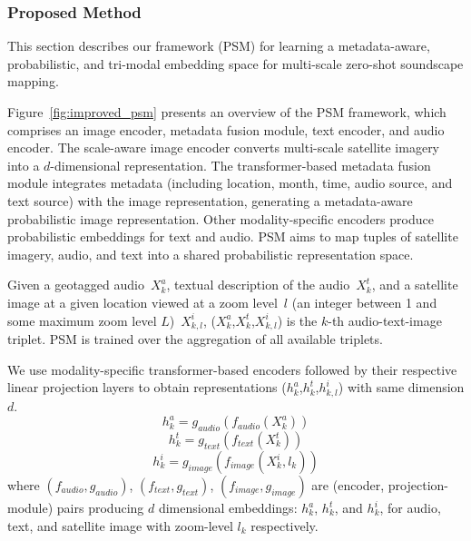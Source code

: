 \subsubsection{Proposed Method}
This section describes our framework (PSM) for learning a metadata-aware, probabilistic, and tri-modal embedding space for multi-scale zero-shot soundscape mapping.

Figure~\ref{fig:improved_psm} presents an overview of the PSM framework, which comprises an image encoder, metadata fusion module, text encoder, and audio encoder. The scale-aware image encoder converts multi-scale satellite imagery into a $d$-dimensional representation. The transformer-based metadata fusion module integrates metadata (including location, month, time, audio source, and text source) with the image representation, generating a metadata-aware probabilistic image representation. Other modality-specific encoders produce probabilistic embeddings for text and audio. PSM aims to map tuples of satellite imagery, audio, and text into a shared probabilistic representation space.

Given a geotagged audio~$X_{k}^{a}$, textual description of the audio~$X_{k}^{t}$, and a satellite image at a given location viewed at a zoom level~$l$ (an integer between 1 and some maximum zoom level $L$)~$X_{k,l}^{i}$,  ($X_{k}^{a}$,$X_{k}^{t}$,$X_{k,l}^{i}$) is the $k$-th audio-text-image triplet. PSM is trained over the aggregation of all available triplets. 

We use modality-specific transformer-based encoders followed by their respective linear projection layers to obtain representations ($h_{k}^{a}$,$h_{k}^{t}$,$h_{k,l}^{i}$) with same dimension $d$. 
%
\begin{equation}\label{eq:6}
h_{k}^{a} = g_{audio}(f_{audio}(X_{k}^{a}))
\end{equation}
\begin{equation}\label{eq:7}
h_{k}^{t} = g_{text}(f_{text}(X_{k}^{t}))
\end{equation}
\begin{equation}\label{eq:8}
h_{k}^{i} = g_{image}(f_{image}(X_{k}^{i}, l_{k}))
\end{equation}
%
where $(f_{audio}, g_{audio})$, $(f_{text}, g_{text})$, $(f_{image}, g_{image})$  are (encoder, projection-module) pairs producing $d$ dimensional embeddings: $h_{k}^{a}$, $h_{k}^{t}$, and $h_{k}^{i}$, for audio, text, and satellite image with zoom-level $l_{k}$ respectively. 

